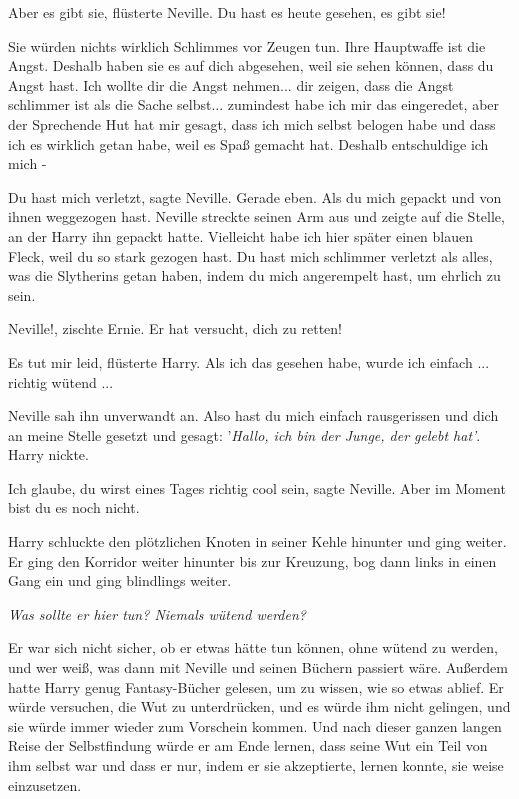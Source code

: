 \glqq{}Aber es gibt sie\grqq{}, flüsterte Neville. \glqq{}Du hast es heute
gesehen, es gibt sie!\grqq{}

\glqq{}Sie würden nichts wirklich Schlimmes vor Zeugen tun. Ihre Hauptwaffe ist
die Angst. Deshalb haben sie es auf dich abgesehen, weil sie sehen können, dass
du Angst hast. Ich wollte dir die Angst nehmen... dir zeigen, dass die Angst
schlimmer ist als die Sache selbst... zumindest habe ich mir das eingeredet,
aber der Sprechende Hut hat mir gesagt, dass ich mich selbst belogen habe und
dass ich es wirklich getan habe, weil es Spaß gemacht hat. Deshalb entschuldige
ich mich -\grqq{}

\glqq{}Du hast mich verletzt\grqq{}, sagte Neville. \glqq{}Gerade eben. Als du
mich gepackt und von ihnen weggezogen hast.\grqq{} Neville streckte seinen Arm
aus und zeigte auf die Stelle, an der Harry ihn gepackt hatte. \glqq{}Vielleicht
habe ich hier später einen blauen Fleck, weil du so stark gezogen hast. Du hast
mich schlimmer verletzt als alles, was die Slytherins getan haben, indem du mich
angerempelt hast, um ehrlich zu sein.\grqq{}

\glqq{}Neville!\grqq{}, zischte Ernie. \glqq{}Er hat versucht, dich zu
retten!\grqq{}

\glqq{}Es tut mir leid\grqq{}, flüsterte Harry. \glqq{}Als ich das gesehen habe,
wurde ich einfach ... richtig wütend ...\grqq{}

Neville sah ihn unverwandt an. \glqq{}Also hast du mich einfach rausgerissen und
dich an meine Stelle gesetzt und gesagt: '\emph{Hallo, ich bin der Junge, der
gelebt hat'}.\grqq{} Harry nickte.

\glqq{}Ich glaube, du wirst eines Tages richtig cool sein\grqq{}, sagte Neville.
\glqq{}Aber im Moment bist du es noch nicht.\grqq{}

Harry schluckte den plötzlichen Knoten in seiner Kehle hinunter und ging weiter.
Er ging den Korridor weiter hinunter bis zur Kreuzung, bog dann links in einen
Gang ein und ging blindlings weiter.

\emph{Was sollte er hier tun? Niemals wütend werden?}

Er war sich nicht sicher, ob er etwas hätte tun können, ohne wütend zu werden,
und wer weiß, was dann mit Neville und seinen Büchern passiert wäre. Außerdem
hatte Harry genug Fantasy-Bücher gelesen, um zu wissen, wie so etwas ablief. Er
würde versuchen, die Wut zu unterdrücken, und es würde ihm nicht gelingen, und
sie würde immer wieder zum Vorschein kommen. Und nach dieser ganzen langen Reise
der Selbstfindung würde er am Ende lernen, dass seine Wut ein Teil von ihm
selbst war und dass er nur, indem er sie akzeptierte, lernen konnte, sie weise
einzusetzen.

